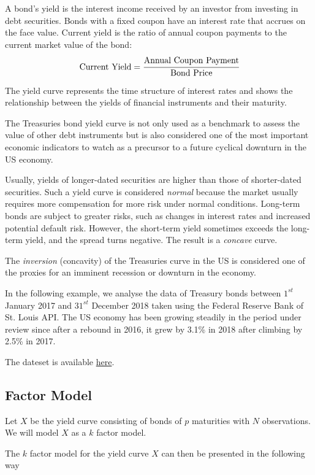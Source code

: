 A bond’s yield is the interest income received by an investor from investing in debt securities. Bonds with a fixed coupon have an interest rate that accrues on the face value.
Current yield is the ratio of annual coupon payments to the current market value of the bond:
$$
\text{Current Yield} = \cfrac{\text{Annual Coupon Payment}}{\text{Bond Price}}
$$

The yield curve represents the time structure of interest rates and shows the relationship between the yields of financial instruments and their maturity.

The Treasuries bond yield curve is not only used as a benchmark to assess the value of other debt instruments but is also considered one of the most important economic indicators to watch as a precursor to a future cyclical downturn in the US economy.

Usually, yields of longer-dated securities are higher than those of shorter-dated securities. Such a yield curve is considered \emph{normal} because the market usually requires more compensation for more risk under normal conditions. Long-term bonds are subject to greater risks, such as changes in interest rates and increased potential default risk.
However, the short-term yield sometimes exceeds the long-term yield, and the spread turns negative. The result is a \emph{concave} curve.

The \emph{inversion} (concavity) of the Treasuries curve in the US is considered one of the proxies for an imminent recession or downturn in the economy.

In the following example, we analyse the data of Treasury bonds between $1^{st}$ January 2017 and $31^{st}$ December 2018 taken using the Federal Reserve Bank of St. Louis API.
The US economy has been growing steadily in the period under review since after a rebound in 2016, it grew by 3.1\% in 2018 after climbing by 2.5\% in 2017.

The dateset is available \href{https://github.com/matteosan1/finance_course/raw/develop/input_files/DGS_2017_2018.csv"}{here}.

\subsection{Factor Model}
Let $X$ be the yield curve consisting of bonds of $p$ maturities with $N$ observations. We will model $X$ as a $k$ factor model.

The $k$ factor model for the yield curve $X$ can then be presented in the following way

